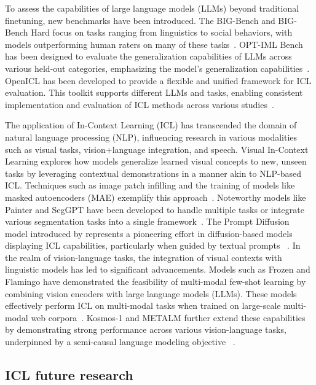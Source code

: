 To assess the capabilities of large language models (LLMs) beyond traditional finetuning, new benchmarks have been introduced.
The BIG-Bench and BIG-Bench Hard focus on tasks ranging from linguistics to social behaviors, with models outperforming human raters on many of these tasks~\cite{srivastava2023imitation, suzgun2022challenging}.
OPT-IML Bench has been designed to evaluate the generalization capabilities of LLMs across various held-out categories, emphasizing the model's generalization capabilities~\cite{iyer2022opt}.
OpenICL has been developed to provide a flexible and unified framework for ICL evaluation.
This toolkit supports different LLMs and tasks, enabling consistent implementation and evaluation of ICL methods across various studies~\cite{wu2023openicl}.

The application of In-Context Learning (ICL) has transcended the domain of natural language processing (NLP), influencing research in various modalities such as visual tasks, vision+language integration, and speech.
Visual In-Context Learning explores how models generalize learned visual concepts to new, unseen tasks by leveraging contextual demonstrations in a manner akin to NLP-based ICL. Techniques such as image patch infilling and the training of models like masked autoencoders (MAE) exemplify this approach~\cite{bar2022visual}.
Noteworthy models like Painter and SegGPT have been developed to handle multiple tasks or integrate various segmentation tasks into a single framework~\cite{wang2023images, wang2023seggpt}.
The Prompt Diffusion model introduced by \textcite{wang2023incontext} represents a pioneering effort in diffusion-based models displaying ICL capabilities, particularly when guided by textual prompts~\cite{wang2023incontext} .
In the realm of vision-language tasks, the integration of visual contexts with linguistic models has led to significant advancements.
Models such as Frozen and Flamingo have demonstrated the feasibility of multi-modal few-shot learning by combining vision encoders with large language models (LLMs).
These models effectively perform ICL on multi-modal tasks when trained on large-scale multi-modal web corpora~\cite{tsimpoukelli2021frozen, alayrac2022flamingo}.
Kosmos-1 and METALM further extend these capabilities by demonstrating strong performance across various vision-language tasks, underpinned by a semi-causal language modeling objective~\cite{huang2023language, hao2022language} .

\subsection{ICL future research}
\label{subsec:icl-future}

